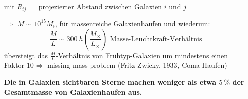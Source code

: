 \begin{itemize}
\begin{align*}
		\end{align*}
		mit $R_{ij}=$ projezierter Abstand zwischen Galaxien $i$ und $j$
	\item[$\Rightarrow$] $M\sim 10^{15}\si{M_\odot}$ für massenreiche Galaxienhaufen und wiederum:
		\begin{equation*}
			\frac{M}{L}\sim \SI{300}{h\left(\frac{M_\odot}{L_\odot}\right)} \text{ Masse-Leuchtkraft-Verhältnis}
		\end{equation*}
		übersteigt das $\frac{M}{L}$-Verhältnis von Frühtyp-Galaxien um mindestens einen Faktor $\num{10}\Rightarrow$ missing mass problem (Fritz Zwicky, 1933, Coma-Haufen)
	\item[] \textbf{Die in Galaxien sichtbaren Sterne machen weniger als etwa $\SI{5}{\%}$ der Gesamtmasse von Galaxienhaufen aus.}
\end{itemize}

